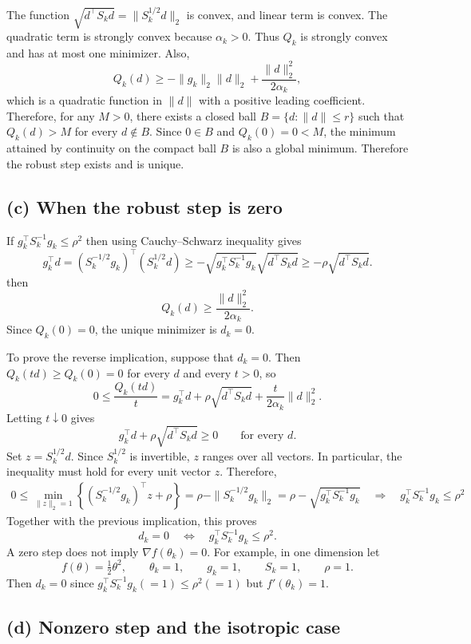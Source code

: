 \documentclass[11pt,a4paper]{article}
\begin{document}
The function $\sqrt{d^\top S_kd}=\|S_k^{1/2}d\|_2$ is convex, and linear term is convex. 
The quadratic term is strongly convex because $\alpha_k>0$.
Thus $Q_k$ is strongly convex and has at most one minimizer.
Also,
\[
    Q_k(d)\geq-\|g_k\|_2\|d\|_2
                   +\frac{\|d\|_2^2}{2\alpha_k},
\]
which is a quadratic function in $\|d\|$ with a positive leading coefficient.
Therefore, for any $M>0$, there exists a closed ball
$B=\{d:\|d\|\leq r\}$ such that $Q_k(d)>M$ for every $d\notin B$.
Since $0\in B$ and $Q_k(0)=0<M$, the minimum attained by continuity
on the compact ball $B$ is also a global minimum.
Therefore the robust step exists and is unique.

\subsection*{(c) When the robust step is zero}

If $g_k^\top S_k^{-1}g_k\leq\rho^2$ then using 
Cauchy--Schwarz inequality gives
\[
    g_k^\top d=(S_k^{-1/2}g_k)^\top(S_k^{1/2}d)
    \geq-\sqrt{g_k^\top S_k^{-1}g_k}\sqrt{d^\top S_kd} \ge - \rho \sqrt{d^\top S_kd}.
\]
then 
\[
    Q_k(d)\geq\frac{\|d\|_2^2}{2\alpha_k}.
\]
Since $Q_k(0)=0$, the unique minimizer is $d_k=0$.

To prove the reverse implication, suppose that $d_k=0$.
Then $Q_k(td)\geq Q_k(0) = 0$ for every $d$ and every $t>0$, so
\[
    0\leq\frac{Q_k(td)}{t}
    =g_k^\top d+\rho\sqrt{d^\top S_kd}
      +\frac{t}{2\alpha_k}\|d\|_2^2.
\]
Letting $t\downarrow 0$ gives
\[
    g_k^\top d+\rho\sqrt{d^\top S_kd}\geq 0
    \qquad\text{for every }d.
\]
Set $z=S_k^{1/2}d$. Since $S_k^{1/2}$ is invertible, $z$ ranges over
all vectors. In particular, the inequality must hold for every unit
vector $z$. Therefore,
\begin{gather*}
    0\leq\min_{\|z\|_2=1}
       \left\{(S_k^{-1/2}g_k)^\top z+\rho\right\}=\rho-\|S_k^{-1/2}g_k\|_2 =\rho-\sqrt{g_k^\top S_k^{-1}g_k}
       \quad \Rightarrow \quad
       g_k^\top S_k^{-1}g_k \le \rho^2
\end{gather*}
Together with the previous implication, this proves
\[
    d_k=0
    \quad\Longleftrightarrow\quad
    g_k^\top S_k^{-1}g_k\leq\rho^2.
\]
A zero step does not imply $\nabla f(\theta_k)=0$.
For example, in one dimension let
\[
    f(\theta)=\tfrac12\theta^2,
    \qquad \theta_k=1,\qquad g_k=1,\qquad S_k=1,\qquad\rho=1.
\]
Then $d_k=0$ since $g_k^\top S_k^{-1}g_k (= 1) \le \rho^2 (= 1)$ but
$f'(\theta_k)=1$.

\subsection*{(d) Nonzero step and the isotropic case}
\end{document}
